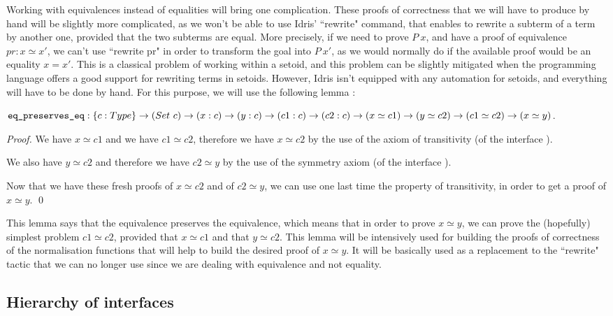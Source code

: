 Working with equivalences instead of equalities will bring one complication. These proofs of correctness that we will have to produce by hand will be slightly more complicated, as we won't be able to use Idris' ``rewrite" command, that enables to rewrite a subterm of a term by another one, provided that the two subterms are equal. More precisely, if we need to prove $P\ x$, and have a proof of equivalence $pr:x \simeq x'$, we can't use ``rewrite pr" in order to transform the goal into $P\ x'$, as we would normally do if the available proof would be an equality $x=x'$. This is a classical problem of working within a setoid, and this problem can be slightly mitigated when the programming language offers a good support for rewriting terms in setoids. However, Idris isn't equipped with any automation for setoids, and everything will have to be done by hand. For this purpose, we will use the following lemma :

${\mbox{\texttt{eq\_preserves\_eq}}} : \{c:Type\} \rightarrow (Set\ c) \rightarrow (x:c) \rightarrow (y:c) \rightarrow (c1:c) \rightarrow (c2:c) \rightarrow (x \simeq c1) \rightarrow (y \simeq c2) \rightarrow (c1 \simeq c2) \rightarrow (x \simeq y)$.

\begin{proof}
We have $x \simeq c1$ and we have $c1 \simeq c2$, therefore we have $x \simeq c2$ by the use of the axiom of transitivity (of the interface ). \

We also have $y \simeq c2$ and therefore we have $c2 \simeq y$ by the use of the symmetry axiom (of the interface ). \

Now that we have these fresh proofs of $x \simeq c2$ and of $c2 \simeq y$, we can use one last time the property of transitivity, in order to get a proof of $x \simeq y$.
\qed
\end{proof}

This lemma says that the equivalence preserves the equivalence, which means that in order to prove $x \simeq y$, we can prove the (hopefully) simplest problem $c1 \simeq c2$, provided that $x \simeq c1$ and that $y \simeq c2$. This lemma will be intensively used for building the proofs of correctness of the normalisation functions that will help to build the desired proof of $x \simeq y$. It will be basically used as a replacement to the ``rewrite" tactic that we can no longer use since we are dealing with equivalence and not equality.

		\subsection{Hierarchy of interfaces}

